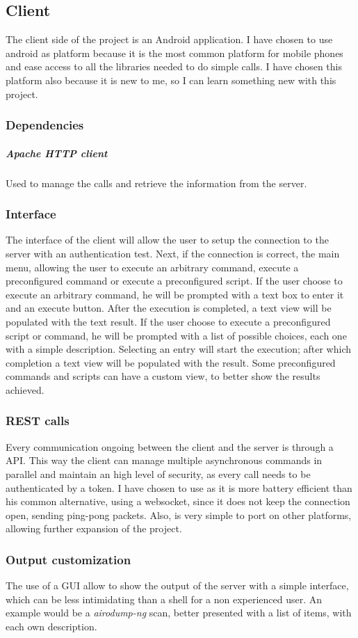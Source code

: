 \documentclass[../PiTest.tex]{subfiles}
\begin{document}
    \subsection{Client}
    The client side of the project is an Android application. I have chosen to use android as platform because it is the most common platform for mobile phones and ease access to all the libraries needed to do simple \REST calls. I have chosen this platform also because it is new to me, so I can learn something new with this project.

    \subsubsection{Dependencies}
    \subparagraph{Apache HTTP client}
    Used to manage the \REST calls and retrieve the information from the server.

    \subsubsection{Interface}
    The interface of the client will allow the user to setup the connection to the server with an authentication test. Next, if the connection is correct, the main menu, allowing the user to execute an arbitrary command, execute a preconfigured command or execute a preconfigured script.
    If the user choose to execute an arbitrary command, he will be prompted with a text box to enter it and an execute button. After the execution is completed, a text view will be populated with the text result.
    If the user choose to execute a preconfigured script or command, he will be prompted with a list of possible choices, each one with a simple description.
    Selecting an entry will start the execution; after which completion a text view will be populated with the result. Some preconfigured commands and scripts can have a custom view, to better show the results achieved.

    \subsubsection{REST calls}
    Every communication ongoing between the client and the server is through a \REST API. This way the client can manage multiple asynchronous commands in parallel and maintain an high level of security, as every call needs to be authenticated by a token. I have chosen to use \REST as it is more battery efficient than his common alternative, using a websocket, since it does not keep the connection open, sending ping-pong packets. Also, \REST is very simple to port on other platforms, allowing further expansion of the project.

    \subsubsection{Output customization}
    The use of a GUI allow to show the output of the server with a simple interface, which can be less intimidating than a shell for a non experienced user. An example would be a \textit{airodump-ng} scan, better presented with a list of items, with each own description.
\end{document}

